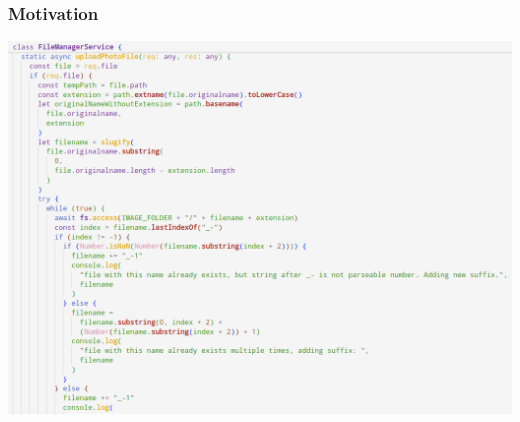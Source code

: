 




\begin{frame}
  \frametitle{Motivation}
  \begin{center}
    \includegraphics[width=\textwidth]{img/01-scary-screenshot-1.png}
  \end{center}
\end{frame}

